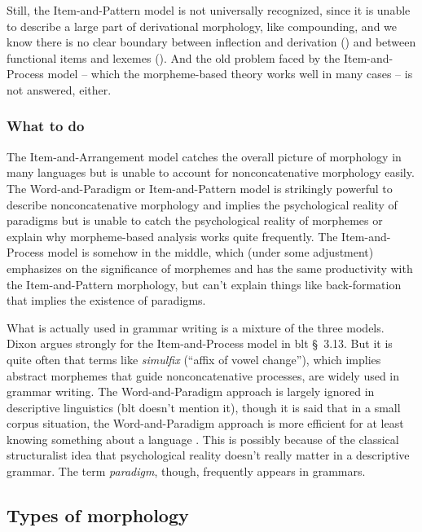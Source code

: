\documentclass[UTF8, a4paper, oneside, scheme=plain]{ctexart}
\newcommand*{\citesec}[1]{\S~{#1}}
\newcommand*{\term}[1]{\emph{#1}}
\begin{document}
Still, the Item-and-Pattern model is not universally recognized,
since it is unable to describe a large part of derivational morphology, like compounding,
and we know there is no clear boundary between inflection and derivation 
()
and between functional items and lexemes 
(). 
And the old problem faced by the Item-and-Process model --
which the morpheme-based theory works well in many cases -- 
is not answered, either.

\subsubsection{What to do}\label{sec:practical-morphology}

The Item-and-Arrangement model catches the overall picture of morphology in many languages
but is unable to account for nonconcatenative morphology easily.
The Word-and-Paradigm or Item-and-Pattern model 
is strikingly powerful to describe nonconcatenative morphology
and implies the psychological reality of paradigms
but is unable to catch the psychological reality of morphemes
or explain why morpheme-based analysis works quite frequently.
The Item-and-Process model is somehow in the middle,
which (under some adjustment) emphasizes on the significance of morphemes
and has the same productivity with the Item-and-Pattern morphology,
but can't explain things like back-formation that implies the existence of paradigms.

What is actually used in grammar writing is a mixture of the three models.
Dixon argues strongly for the Item-and-Process model in \ac{blt} \citesec{3.13}.
But it is quite often that terms like \term{simulfix} (``affix of vowel change''),
which implies abstract morphemes that guide nonconcatenative processes,
are widely used in grammar writing.
The Word-and-Paradigm approach is largely ignored in descriptive linguistics
(\ac{blt} doesn't mention it),
though it is said that in a small corpus situation,
the Word-and-Paradigm approach is more efficient 
for at least knowing something about a language \citep{copot2022word}.
This is possibly because of the classical structuralist idea that
psychological reality doesn't really matter 
in a descriptive grammar.
The term \term{paradigm}, though, frequently appears in grammars.

\subsection{Types of morphology}
\end{document}
